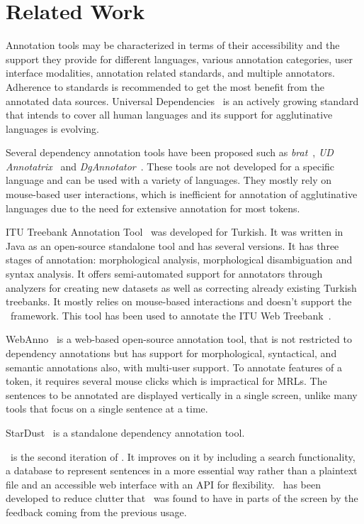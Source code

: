\section{Related Work}
\label{sec:related}

Annotation tools may be characterized in terms of their accessibility and the support they provide for different languages, various annotation categories, user interface modalities, annotation related standards, and multiple annotators.
Adherence to standards is recommended to get the most benefit from the annotated data sources.
Universal Dependencies~\cite{UD} is an actively growing standard that intends to cover all human languages and its support for agglutinative languages is evolving.

Several dependency annotation tools have been proposed such as \textit{brat}~\cite{brat}, \textit{UD Annotatrix}~\cite{tyers-etal:2018} and \textit{DgAnnotator}~\cite{dgannotator,UD-tools}.
These tools are not developed for a specific language and can be used with a variety of languages.
They mostly rely on mouse-based user interactions, which is inefficient for annotation of agglutinative languages due to the need for extensive annotation for most tokens.

ITU Treebank Annotation Tool~\cite{pamay-etal-2015-annotation} was developed for Turkish.
It was written in Java as an open-source standalone tool and has several versions.
It has three stages of annotation: morphological analysis, morphological disambiguation and syntax analysis.
It offers semi-automated support for annotators through analyzers for creating new datasets as well as correcting already existing Turkish treebanks.
It mostly relies on mouse-based interactions and doesn't support the \ud\ framework.
This tool has been used to annotate the ITU Web Treebank~\cite{itu-web-tb}.

WebAnno~\cite{webanno} is a web-based open-source annotation tool, that is not restricted to dependency annotations but has support for morphological, syntactical, and semantic annotations also, with multi-user support.
To annotate features of a token, it requires several mouse clicks which is impractical for MRLs.
The sentences to be annotated are displayed vertically in a single screen, unlike many tools that focus on a single sentence at a time.

StarDust~\cite{stardust} is a standalone dependency annotation tool.

\boatvtwo\ is the second iteration of \boatvone.
It improves on it by including a search functionality, a database to represent sentences in a more essential way rather than a plaintext file and an accessible web interface with an API for flexibility.
\boatvtwo\ has been developed to reduce clutter that \boatvone\ was found to have in parts of the screen by the feedback coming from the previous \boatvone usage.

